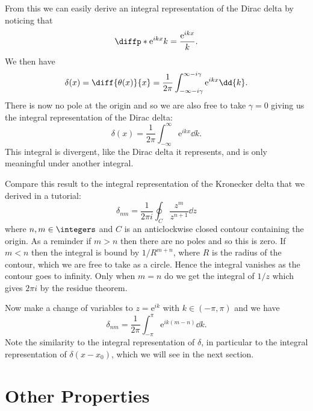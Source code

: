 \documentclass[fleqn]{NotesClass}
\newcommand*{\e}{\mathrm{e}}
\begin{document}
    From this we can easily derive an integral representation of the Dirac delta by noticing that
    \begin{equation}
        \diffp*{\e^{ikx}}{k} = \frac{\e^{ikx}}{k}.
    \end{equation}
    We then have
    \begin{equation}
        \delta(x) = \diff{\theta(x)}{x} = \frac{1}{2\pi} \int_{-\infty-i\gamma}^{\infty-i\gamma} \e^{ikx} \dd{k}.
    \end{equation}
    There is now no pole at the origin and so we are also free to take \(\gamma = 0\) giving us the integral representation of the Dirac delta:
    \begin{equation}
        \delta(x) = \frac{1}{2\pi}\int_{-\infty}^{\infty} \e^{ikx} \dd{k}.
    \end{equation}
    This integral is divergent, like the Dirac delta it represents, and is only meaningful under another integral.
    
    Compare this result to the integral representation of the Kronecker delta that we derived in a tutorial:
    \begin{equation}
        \delta_{nm} = \frac{1}{2\pi i} \oint_{C} \frac{z^m}{z^{n+1}} \dd{z}
    \end{equation}
    where \(n, m \in \integers\) and \(C\) is an anticlockwise closed contour containing the origin.
    As a reminder if \(m > n\) then there are no poles and so this is zero.
    If \(m < n\) then the integral is bound by \(1/R^{m+n}\), where \(R\) is the radius of the contour, which we are free to take as a circle.
    Hence the integral vanishes as the contour goes to infinity.
    Only when \(m = n\) do we get the integral of \(1/z\) which gives \(2\pi i\) by the residue theorem.
    
    Now make a change of variables to \(z = \e^{ik}\) with \(k \in (-\pi, \pi)\) and we have
    \begin{equation}\label{eqn:integral representation kronecker delta}
        \delta_{nm} = \frac{1}{2\pi} \int_{-\pi}^{\pi} \e^{ik(m - n)} \dd{k}.
    \end{equation}
    Note the similarity to the integral representation of \(\delta\), in particular to the integral representation of \(\delta(x - x_0)\), which we will see in the next section.
    
    \section{Other Properties}
\end{document}
